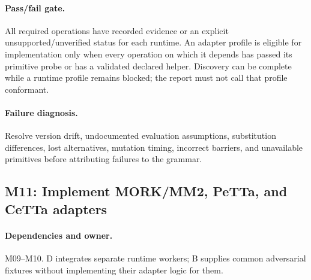 \documentclass[11pt,a4paper]{article}
\begin{document}
\paragraph{Pass/fail gate.} All required operations have recorded evidence or
an explicit unsupported/unverified status for each runtime. An adapter profile
is eligible for implementation only when every operation on which it depends
has passed its primitive probe or has a validated declared helper. Discovery can be complete while a runtime
profile remains blocked; the report must not call that profile conformant.

\paragraph{Failure diagnosis.} Resolve version drift, undocumented evaluation
assumptions, substitution differences, lost alternatives, mutation timing,
incorrect barriers, and unavailable primitives before attributing failures
to the grammar.

\subsection{M11: Implement MORK/MM2, PeTTa, and CeTTa adapters}

\paragraph{Dependencies and owner.} M09--M10. D integrates separate runtime
workers; B supplies common adversarial fixtures without implementing their
adapter logic for them.
\end{document}
